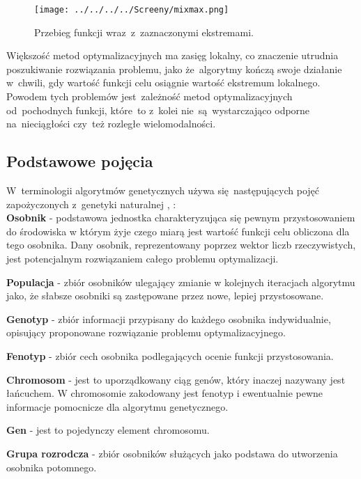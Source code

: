\begin{figure}[h!]
\begin{center}
		\texttt{[image: ../../../../Screeny/mixmax.png]}
		\caption{Przebieg funkcji wraz~z~zaznaczonymi ekstremami.}
		\label{minmax}		
\end{center}	
\end{figure}

Większość metod optymalizacyjnych ma zasięg lokalny, co znaczenie utrudnia poszukiwanie rozwiązania problemu, jako że~algorytmy kończą swoje działanie w~chwili, gdy wartość funkcji celu osiągnie wartość ekstremum lokalnego. Powodem tych problemów jest~zależność metod optymalizacyjnych od~pochodnych funkcji, które~to z~kolei nie~są~wystarczająco odporne na~nieciągłości czy~też rozległe wielomodalności.
\par

\subsection{Podstawowe pojęcia}
W~terminologii algorytmów genetycznych używa się~następujących pojęć zapożyczonych z~genetyki naturalnej \cite{michal}, \cite{maszynowe_sel}:\\

\textbf{Osobnik} - podstawowa jednostka charakteryzująca się pewnym przystosowaniem do środowiska w którym żyje czego miarą jest wartość funkcji celu obliczona dla tego osobnika. Dany osobnik, reprezentowany poprzez wektor liczb rzeczywistych, jest potencjalnym rozwiązaniem całego problemu optymalizacji.

\textbf{Populacja} - zbiór osobników ulegający zmianie w kolejnych iteracjach algorytmu jako, że słabsze osobniki są zastępowane przez nowe, lepiej przystosowane.

\textbf{Genotyp} - zbiór informacji przypisany do każdego osobnika indywidualnie, opisujący proponowane rozwiązanie problemu optymalizacyjnego.

\textbf{Fenotyp} - zbiór cech osobnika podlegających ocenie funkcji przystosowania.

\textbf{Chromosom} - jest to uporządkowany ciąg genów, który inaczej nazywany jest łańcuchem. W chromosomie zakodowany jest fenotyp i ewentualnie pewne informacje pomocnicze dla algorytmu genetycznego.

\textbf{Gen} - jest to pojedynczy element chromosomu.

\textbf{Grupa rozrodcza} - zbiór osobników służących jako podstawa do utworzenia osobnika potomnego.

